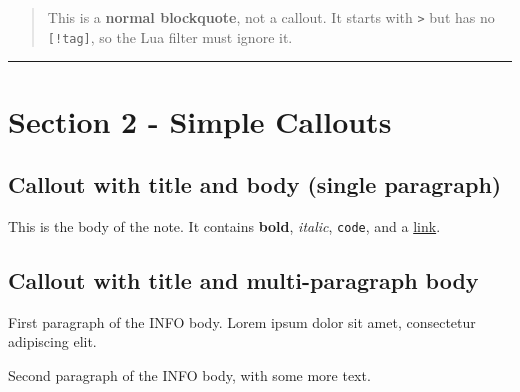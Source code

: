 \begin{tcolorbox}[breakable,colback=ocGryBack,colframe=ocGryFrame,coltitle=ocGryTitle,left=3mm,boxed title style={left=1mm},title={\hspace*{-2.5mm}\iconInfo\; md2pdf - inner with explicit \texttt{shift-heading=0}}]
\begin{quote}
This is a \textbf{normal blockquote}, not a callout. It starts with
\texttt{\textgreater{}} but has no \texttt{{[}!tag{]}}, so the Lua
filter must ignore it.
\end{quote}

\begin{center}\rule{0.5\linewidth}{0.5pt}\end{center}

\section*{Section 2 - Simple
Callouts}\label{inner-3-section-2---simple-callouts}

\subsection*{Callout with title and body (single
paragraph)}\label{inner-3-callout-with-title-and-body-single-paragraph}

\begin{tcolorbox}[breakable,colback=ocGryBack,colframe=ocGryFrame,coltitle=ocGryTitle,left=3mm,boxed title style={left=1mm},title={\hspace*{-2.5mm}\iconNote\; A simple NOTE callout}]

This is the body of the note. It contains \textbf{bold}, \emph{italic},
\texttt{code}, and a \href{https://example.com}{link}.

\end{tcolorbox}

\subsection*{Callout with title and multi-paragraph
body}\label{inner-3-callout-with-title-and-multi-paragraph-body}

\begin{tcolorbox}[breakable,colback=ocGryBack,colframe=ocGryFrame,coltitle=ocGryTitle,left=3mm,boxed title style={left=1mm},title={\hspace*{-2.5mm}\iconInfo\; Info with multi-paragraph body}]

First paragraph of the INFO body. Lorem ipsum dolor sit amet,
consectetur adipiscing elit.

Second paragraph of the INFO body, with some more text.

\end{tcolorbox}


\end{tcolorbox}
